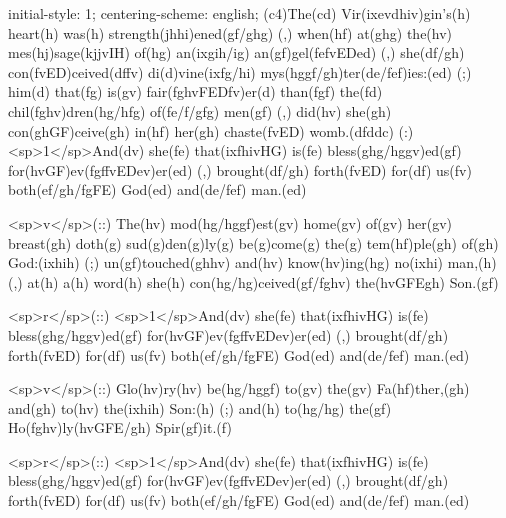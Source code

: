 initial-style: 1;
centering-scheme: english;
(c4)The(cd) Vir(ixevdhiv)gin's(h) heart(h) was(h) strength(jhhi)ened(gf/ghg) (,) when(hf) at(ghg) the(hv) mes(hj)sage(kjjvIH) of(hg) an(ixgih/ig) an(gf)gel(fefvEDed) (,) she(df/gh) con(fvED)ceived(dffv) di(d)vine(ixfg/hi) mys(hggf/gh)ter(de/fef)ies:(ed) (;) him(d) that(fg) is(gv) fair(fghvFEDfv)er(d) than(fgf) the(fd) chil(fghv)dren(hg/hfg) of(fe/f/gfg) men(gf) (,) did(hv) she(gh) con(ghGF)ceive(gh) in(hf) her(gh) chaste(fvED) womb.(dfddc) (:) <sp>1</sp>And(dv) she(fe) that(ixfhivHG) is(fe) bless(ghg/hggv)ed(gf) for(hvGF)ev(fgffvEDev)er(ed) (,) brought(df/gh) forth(fvED) for(df) us(fv) both(ef/gh/fgFE) God(ed) and(de/fef) man.(ed)

<sp>v</sp>(::) The(hv) mod(hg/hggf)est(gv) home(gv) of(gv) her(gv) breast(gh) doth(g) sud(g)den(g)ly(g) be(g)come(g) the(g) tem(hf)ple(gh) of(gh) God:(ixhih) (;) un(gf)touched(ghhv) and(hv) know(hv)ing(hg) no(ixhi) man,(h) (,) at(h) a(h) word(h) she(h) con(hg/hg)ceived(gf/fghv) the(hvGFEgh) Son.(gf)

<sp>r</sp>(::) <sp>1</sp>And(dv) she(fe) that(ixfhivHG) is(fe) bless(ghg/hggv)ed(gf) for(hvGF)ev(fgffvEDev)er(ed) (,) brought(df/gh) forth(fvED) for(df) us(fv) both(ef/gh/fgFE) God(ed) and(de/fef) man.(ed)

<sp>v</sp>(::) Glo(hv)ry(hv) be(hg/hggf) to(gv) the(gv) Fa(hf)ther,(gh) and(gh) to(hv) the(ixhih) Son:(h) (;) and(h) to(hg/hg) the(gf) Ho(fghv)ly(hvGFE/gh) Spir(gf)it.(f)

<sp>r</sp>(::) <sp>1</sp>And(dv) she(fe) that(ixfhivHG) is(fe) bless(ghg/hggv)ed(gf) for(hvGF)ev(fgffvEDev)er(ed) (,) brought(df/gh) forth(fvED) for(df) us(fv) both(ef/gh/fgFE) God(ed) and(de/fef) man.(ed)